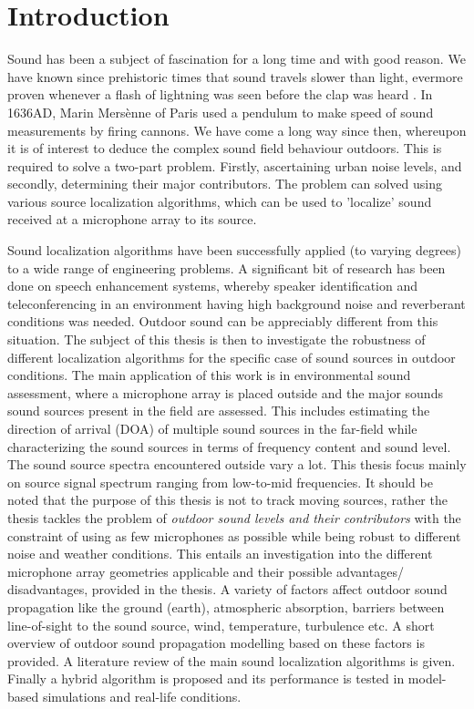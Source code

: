 \section{Introduction}

Sound has been a subject of fascination for a long time and with good reason. We have known since prehistoric times that sound travels slower than light, evermore proven whenever a flash of lightning was seen before the clap was heard \cite{ampel1993history}.  In 1636AD, Marin Mersènne of Paris used a pendulum to make speed of sound measurements by firing cannons. We have come a long way since then, whereupon it is of interest to deduce the complex sound field behaviour outdoors. This is required to solve a two-part problem. Firstly, ascertaining urban noise levels, and secondly, determining their major contributors. The problem can solved using various source localization algorithms, which can be used to 'localize' sound received at a microphone array to its source.

Sound localization algorithms have been successfully applied (to varying degrees) to a wide range of engineering problems. A significant bit of research has been done on speech enhancement systems, whereby speaker identification and teleconferencing in an environment having high background noise and reverberant conditions was needed. Outdoor sound can be appreciably different from this situation. The subject of this thesis is then to investigate the robustness of different localization algorithms for the specific case of sound sources in outdoor conditions. The main application of this work is in environmental sound assessment, where a microphone array is placed outside and the major sounds sound sources present in the field are assessed. This includes estimating the direction of arrival (DOA) of multiple sound sources in the far-field while characterizing the sound sources in terms of frequency content and sound level. The sound source spectra encountered outside vary a lot. This thesis focus mainly on source signal spectrum ranging from low-to-mid frequencies. It should be noted that the purpose of this thesis is not to track moving sources, rather the thesis tackles the problem of \textit{outdoor sound levels and their contributors} with the constraint of using as few microphones as possible while being robust to different noise and weather conditions. This entails an investigation into the different microphone array geometries applicable and their possible advantages/ disadvantages, provided in the thesis. A variety of factors affect outdoor sound propagation like the ground (earth), atmospheric absorption, barriers between line-of-sight to the sound source, wind, temperature, turbulence etc. A short overview of outdoor sound propagation modelling based on these factors is provided. A literature review of the main sound localization algorithms is given. Finally a hybrid algorithm is proposed and its performance is tested in model-based simulations and real-life conditions.




